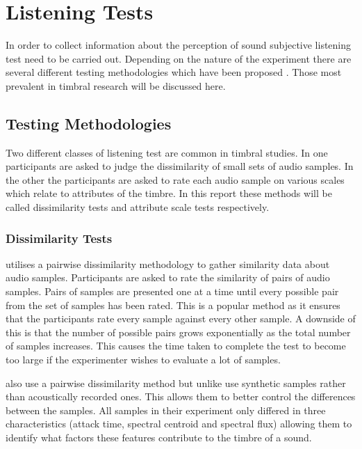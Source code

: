 \section{Listening Tests}
\label{sec:Timbre-ListeningTests}
	In order to collect information about the perception of sound subjective listening test need to be carried out.
	Depending on the nature of the experiment there are several different testing methodologies which have been proposed
	\citep{bech2006perceptual}. Those most prevalent in timbral research will be discussed here.

	\subsection{Testing Methodologies}
	\label{sec:Timbre-ListeningTests-Methods}
		Two different classes of listening test are common in timbral studies. In one participants are asked to
		judge the dissimilarity of small sets of audio samples. In the other the participants are asked to rate each
		audio sample on various scales which relate to attributes of the timbre. In this report these methods will
		be called dissimilarity tests and attribute scale tests respectively.

		\subsubsection*{Dissimilarity Tests}
			\citet{grey1977multidimensional} utilises a pairwise dissimilarity methodology to gather similarity
			data about audio samples.  Participants are asked to rate the similarity of pairs of audio samples.
			Pairs of samples are presented one at a time until every possible pair from the set of samples has
			been rated. This is a popular method as it ensures that the participants rate every sample against
			every other sample. A downside of this is that the number of possible pairs grows exponentially as
			the total number of samples increases. This causes the time taken to complete the test to become too
			large if the experimenter wishes to evaluate a lot of samples.

			\citet{caclin2005acoustic} also use a pairwise dissimilarity method but unlike
			\citet{grey1977multidimensional} use synthetic samples rather than acoustically recorded ones. This
			allows them to better control the differences between the samples. All samples in their experiment
			only differed in three characteristics (attack time, spectral centroid and spectral flux) allowing
			them to identify what factors these features contribute to the timbre of a sound.


